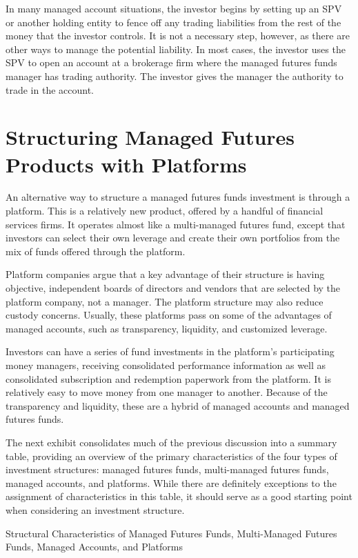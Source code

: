 \documentclass[11pt]{article}
\begin{document}
In many managed account situations, the investor begins by setting up an SPV or another holding entity to fence off any trading liabilities from the rest of the money that the investor controls. It is not a necessary step, however, as there are other ways to manage the potential liability. In most cases, the investor uses the SPV to open an account at a brokerage firm where the managed futures funds manager has trading authority. The investor gives the manager the authority to trade in the account.

\section*{Structuring Managed Futures Products with Platforms}
An alternative way to structure a managed futures funds investment is through a platform. This is a relatively new product, offered by a handful of financial services firms. It operates almost like a multi-managed futures fund, except that investors can select their own leverage and create their own portfolios from the mix of funds offered through the platform.

Platform companies argue that a key advantage of their structure is having objective, independent boards of directors and vendors that are selected by the platform company, not a manager. The platform structure may also reduce custody concerns. Usually, these platforms pass on some of the advantages of managed accounts, such as transparency, liquidity, and customized leverage.

Investors can have a series of fund investments in the platform's participating money managers, receiving consolidated performance information as well as consolidated subscription and redemption paperwork from the platform. It is relatively easy to move money from one manager to another. Because of the transparency and liquidity, these are a hybrid of managed accounts and managed futures funds.

The next exhibit consolidates much of the previous discussion into a summary table, providing an overview of the primary characteristics of the four types of investment structures: managed futures funds, multi-managed futures funds, managed accounts, and platforms. While there are definitely exceptions to the assignment of characteristics in this table, it should serve as a good starting point when considering an investment structure.

Structural Characteristics of Managed Futures Funds, Multi-Managed Futures Funds, Managed Accounts, and Platforms
\end{document}
